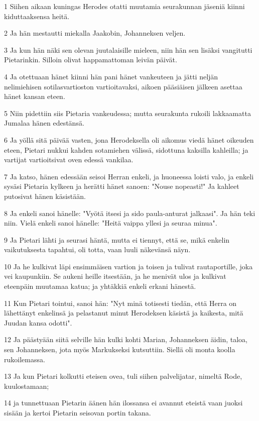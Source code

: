 \par 1 Siihen aikaan kuningas Herodes otatti muutamia seurakunnan jäseniä kiinni kiduttaaksensa heitä.
\par 2 Ja hän mestautti miekalla Jaakobin, Johanneksen veljen.
\par 3 Ja kun hän näki sen olevan juutalaisille mieleen, niin hän sen lisäksi vangitutti Pietarinkin. Silloin olivat happamattoman leivän päivät.
\par 4 Ja otettuaan hänet kiinni hän pani hänet vankeuteen ja jätti neljän nelimiehisen sotilasvartioston vartioitavaksi, aikoen pääsiäisen jälkeen asettaa hänet kansan eteen.
\par 5 Niin pidettiin siis Pietaria vankeudessa; mutta seurakunta rukoili lakkaamatta Jumalaa hänen edestänsä.
\par 6 Ja yöllä sitä päivää vasten, jona Herodeksella oli aikomus viedä hänet oikeuden eteen, Pietari nukkui kahden sotamiehen välissä, sidottuna kaksilla kahleilla; ja vartijat vartioitsivat oven edessä vankilaa.
\par 7 Ja katso, hänen edessään seisoi Herran enkeli, ja huoneessa loisti valo, ja enkeli sysäsi Pietaria kylkeen ja herätti hänet sanoen: "Nouse nopeasti!" Ja kahleet putosivat hänen käsistään.
\par 8 Ja enkeli sanoi hänelle: "Vyötä itsesi ja sido paula-anturat jalkaasi". Ja hän teki niin. Vielä enkeli sanoi hänelle: "Heitä vaippa yllesi ja seuraa minua".
\par 9 Ja Pietari lähti ja seurasi häntä, mutta ei tiennyt, että se, mikä enkelin vaikutuksesta tapahtui, oli totta, vaan luuli näkevänsä näyn.
\par 10 Ja he kulkivat läpi ensimmäisen vartion ja toisen ja tulivat rautaportille, joka vei kaupunkiin. Se aukeni heille itsestään, ja he menivät ulos ja kulkivat eteenpäin muutamaa katua; ja yhtäkkiä enkeli erkani hänestä.
\par 11 Kun Pietari tointui, sanoi hän: "Nyt minä totisesti tiedän, että Herra on lähettänyt enkelinsä ja pelastanut minut Herodeksen käsistä ja kaikesta, mitä Juudan kansa odotti".
\par 12 Ja päästyään siitä selville hän kulki kohti Marian, Johanneksen äidin, taloa, sen Johanneksen, jota myös Markukseksi kutsuttiin. Siellä oli monta koolla rukoilemassa.
\par 13 Ja kun Pietari kolkutti eteisen ovea, tuli siihen palvelijatar, nimeltä Rode, kuulostamaan;
\par 14 ja tunnettuaan Pietarin äänen hän ilossansa ei avannut eteistä vaan juoksi sisään ja kertoi Pietarin seisovan portin takana.
